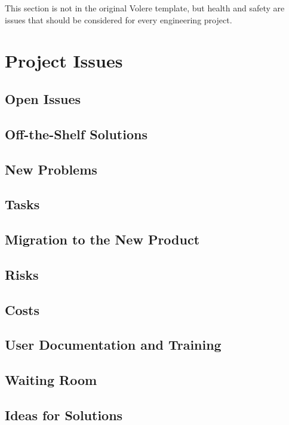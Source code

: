 \documentclass[12pt, titlepage]{article}
\begin{document}
This section is not in the original Volere template, but health and safety are
issues that should be considered for every engineering project.

\section{Project Issues}

\subsection{Open Issues}

\subsection{Off-the-Shelf Solutions}

\subsection{New Problems}

\subsection{Tasks}

\subsection{Migration to the New Product}

\subsection{Risks}

\subsection{Costs}

\subsection{User Documentation and Training}

\subsection{Waiting Room}

\subsection{Ideas for Solutions}
\end{document}

